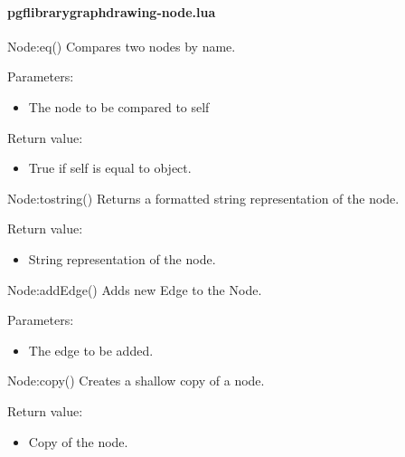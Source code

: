 
\paragraph{pgflibrarygraphdrawing-node.lua}


\begin{luacommand}{{Node:\textunderscore{}\textunderscore{}eq}()}
Compares two nodes by name.

Parameters:
\begin{itemize}
	\item[]  \subitem The node to be compared to self
\end{itemize}


Return value:
\begin{itemize} \item[] True if self is equal to object. \end{itemize}


\end{luacommand}\begin{luacommand}{{Node:\textunderscore{}\textunderscore{}tostring}()}
Returns a formatted string representation of the node.


Return value:
\begin{itemize} \item[] String representation of the node. \end{itemize}


\end{luacommand}\begin{luacommand}{{Node:addEdge}()}
Adds new Edge to the Node.

Parameters:
\begin{itemize}
	\item[]  \subitem The edge to be added.
\end{itemize}



\end{luacommand}\begin{luacommand}{{Node:copy}()}
Creates a shallow copy of a node.


Return value:
\begin{itemize} \item[] Copy of the node. \end{itemize}



\end{luacommand}
